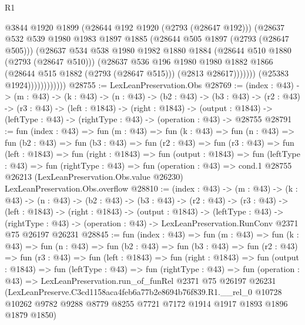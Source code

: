 \begin{lexlean}{R1}
\begin{coremodule}
                                @3844
                                @1920
                                @1899
                                (@28644 @192 @1920 (@2793 (@28647 @192)))
                                (@28637
                                  @532
                                  @539
                                  @1980
                                  @1983
                                  @1897
                                  @1885
                                  (@28644 @505 @1897 (@2793 (@28647 @505)))
                                  (@28637
                                    @534
                                    @538
                                    @1980
                                    @1982
                                    @1880
                                    @1884
                                    (@28644 @510 @1880 (@2793 (@28647 @510)))
                                    (@28637
                                      @536
                                      @196
                                      @1980
                                      @1980
                                      @1882
                                      @1866
                                      (@28644 @515 @1882 (@2793 (@28647 @515)))
                                      (@2813 @28617)))))))
                          (@25383 @1924))))))))))))
@28755 := LexLeanPreservation.Obs
@28769 := (index : @43) ->
  (m : @43) ->
  (k : @43) ->
  (n : @43) ->
  (b2 : @43) ->
  (b3 : @43) ->
  (r2 : @43) ->
  (r3 : @43) ->
  (left : @1843) ->
  (right : @1843) ->
  (output : @1843) -> (leftType : @43) -> (rightType : @43) -> (operation : @43) -> @28755
@28791 := fun (index : @43) =>
  fun (m : @43) =>
  fun (k : @43) =>
  fun (n : @43) =>
  fun (b2 : @43) =>
  fun (b3 : @43) =>
  fun (r2 : @43) =>
  fun (r3 : @43) =>
  fun (left : @1843) =>
  fun (right : @1843) =>
  fun (output : @1843) =>
  fun (leftType : @43) =>
  fun (rightType : @43) =>
  fun (operation : @43) =>
  cond.{1} @28755 @26213 (LexLeanPreservation.Obs.value @26230) LexLeanPreservation.Obs.overflow
@28810 := (index : @43) ->
  (m : @43) ->
  (k : @43) ->
  (n : @43) ->
  (b2 : @43) ->
  (b3 : @43) ->
  (r2 : @43) ->
  (r3 : @43) ->
  (left : @1843) ->
  (right : @1843) ->
  (output : @1843) ->
  (leftType : @43) ->
  (rightType : @43) -> (operation : @43) -> LexLeanPreservation.RunConv @2371 @75 @26197 @26231
@28845 := fun (index : @43) =>
  fun (m : @43) =>
  fun (k : @43) =>
  fun (n : @43) =>
  fun (b2 : @43) =>
  fun (b3 : @43) =>
  fun (r2 : @43) =>
  fun (r3 : @43) =>
  fun (left : @1843) =>
  fun (right : @1843) =>
  fun (output : @1843) =>
  fun (leftType : @43) =>
  fun (rightType : @43) =>
  fun (operation : @43) =>
  LexLeanPreservation.run_of_funRel
    @2371
    @75
    @26197
    @26231
    (LexLeanPreserve.C3cd1158aca4feb6a77b2e8694b76f839.R1.__rel_0
      @10728
      @10262
      @9782
      @9288
      @8779
      @8255
      @7721
      @7172
      @1914
      @1917
      @1893
      @1896
      @1879
      @1850)
\end{coremodule}
\end{lexlean}
